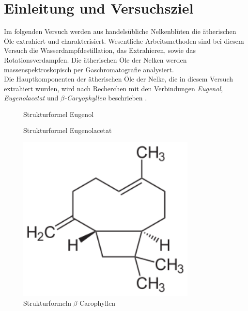 \section{Einleitung und Versuchsziel}
\label{sec:aufgabenstellung}

Im folgenden Versuch werden aus handelsübliche Nelkenblüten die ätherischen Öle extrahiert und charakterisiert. Wesentliche Arbeitsmethoden sind bei diesem Versuch die Wasserdampfdestillation, das Extrahieren, sowie das Rotationsverdampfen. Die ätherischen Öle der Nelken werden massenspektroskopisch per  Gaschromatografie analysiert.\\
Die Hauptkomponenten der ätherischen Öle der Nelke, die in diesem Versuch extrahiert wurden, wird nach Recherchen mit den Verbindungen \textit{Eugenol}, \textit{Eugenolacetat} und \textit{$\beta$-Caryophyllen} beschrieben \cite{Berger.2017,Krammer.2003,ROMPPRedaktion.2002}.


\begin{figure}[h!]
	\begin{minipage}{0.32\textwidth}
			\caption{Strukturformel Eugenol}\label{fig:eugenol}
	\end{minipage}\hfill
	\begin{minipage}{0.32\textwidth}
			\caption{Strukturformel Eugenolacetat}\label{fig:eegenol_ac}
	\end{minipage}\hfill
	\begin{minipage}{0.32\textwidth}
			\includegraphics[width=0.8\textwidth]{img/caro}
			\caption{Strukturformeln $\beta$-Carophyllen}\label{fig:caro}
	\end{minipage}\hfill
\end{figure}
\FloatBarrier


